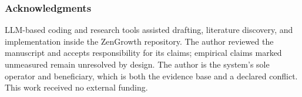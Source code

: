 \documentclass[11pt]{article}
\begin{document}
\subsubsection*{Acknowledgments}
LLM-based coding and research tools assisted drafting, literature discovery,
and implementation inside the ZenGrowth repository. The author reviewed the
manuscript and accepts responsibility for its claims; empirical claims marked
unmeasured remain unresolved by design. The author is the system's sole
operator and beneficiary, which is both the evidence base and a declared
conflict. This work received no external funding.


\small
\setlength{\bibsep}{2pt}

\end{document}

